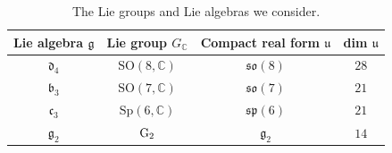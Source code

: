 \documentclass[pdftex]{sigma}
\numberwithin{equation}{section}
\newcommand{\SO}{{\mathrm{SO}}}
\newcommand{\Sp}{{\mathrm{Sp}}}
\newcommand{\GG}{{\rm G}_2}
\begin{document}
 \begin{table}[h!]\centering\renewcommand{\arraystretch}{1.3}
\begin{tabular}{*{4}{c}}
Lie algebra $\mathfrak{g}$ & Lie group $G_\mathbb{C}$ & Compact real form $\mathfrak{u}$ & dim $\mathfrak{u}$ \\
\hline
$\mathfrak{d}_{4}$ & $\SO(8,\mathbb{C})$	&$\mathfrak{so}(8)$ & $28$ \\
$\mathfrak{b}_{3}$ & $\SO(7,\mathbb{C})$	&$\mathfrak{so}(7)$ & $21$ \\
$\mathfrak{c}_{3}$ & $\Sp(6,\mathbb{C})$	&$\mathfrak{sp}(6)$ & $21$ \\
$\mathfrak{g}_{2}$ & $\GG$	&$\mathfrak{g}_2$ & $14$ \\
 \end{tabular}
\caption{The Lie groups and Lie algebras we consider.}\label{table1}%
\end{table}
\end{document}
